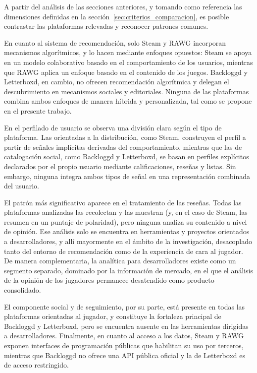 A partir del análisis de las secciones anteriores, y tomando como referencia las dimensiones definidas en la sección~\ref{sec:criterios_comparacion}, es posible contrastar las plataformas relevadas y reconocer patrones comunes.

En cuanto al sistema de recomendación, solo Steam y RAWG incorporan mecanismos algorítmicos, y lo hacen mediante enfoques opuestos: Steam se apoya en un modelo colaborativo basado en el comportamiento de los usuarios, mientras que RAWG aplica un enfoque basado en el contenido de los juegos. Backloggd y Letterboxd, en cambio, no ofrecen recomendación algorítmica y delegan el descubrimiento en mecanismos sociales y editoriales. Ninguna de las plataformas combina ambos enfoques de manera híbrida y personalizada, tal como se propone en el presente trabajo.

En el perfilado de usuario se observa una división clara según el tipo de plataforma. Las orientadas a la distribución, como Steam, construyen el perfil a partir de señales implícitas derivadas del comportamiento, mientras que las de catalogación social, como Backloggd y Letterboxd, se basan en perfiles explícitos declarados por el propio usuario mediante calificaciones, reseñas y listas. Sin embargo, ninguna integra ambos tipos de señal en una representación combinada del usuario.

El patrón más significativo aparece en el tratamiento de las reseñas. Todas las plataformas analizadas las recolectan y las muestran (y, en el caso de Steam, las resumen en un puntaje de polaridad), pero ninguna analiza su contenido a nivel de opinión. Ese análisis solo se encuentra en herramientas y proyectos orientados a desarrolladores, y allí mayormente en el ámbito de la investigación, desacoplado tanto del entorno de recomendación como de la experiencia de cara al jugador. De manera complementaria, la analítica para desarrolladores existe como un segmento separado, dominado por la información de mercado, en el que el análisis de la opinión de los jugadores permanece desatendido como producto consolidado.

El componente social y de seguimiento, por su parte, está presente en todas las plataformas orientadas al jugador, y constituye la fortaleza principal de Backloggd y Letterboxd, pero se encuentra ausente en las herramientas dirigidas a desarrolladores. Finalmente, en cuanto al acceso a los datos, Steam y RAWG exponen interfaces de programación públicas que habilitan su uso por terceros, mientras que Backloggd no ofrece una API pública oficial y la de Letterboxd es de acceso restringido.

